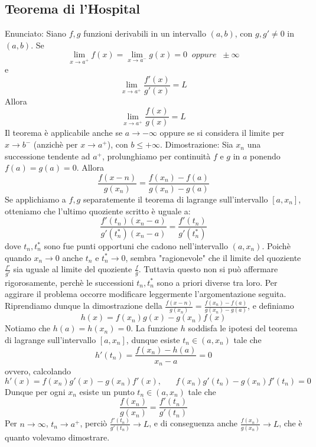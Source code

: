 \documentclass[a4paper, 9pt]{report}
\begin{document}
\subsection*{Teorema di l'Hospital}
Enunciato:\newline
Siano $f, g$ funzioni derivabili in un intervallo $(a,b)$, con $g,g' \neq 0$ in $(a,b)$. Se
\[
    \lim_{x\rightarrow a^+}f(x) = \lim_{x\rightarrow a^-}g(x) = 0 \;\;oppure \;\;\pm \infty
\]
e
\[
    \lim_{x\rightarrow a^+} \frac{f'(x)}{g'(x)}= L
\]
Allora 
\[
    \lim_{x\rightarrow a^+} \frac{f(x)}{g(x)} = L
\]
Il teorema è applicabile anche se $a \rightarrow -\infty$ oppure se si considera il limite per $x \rightarrow b^-$ (anzichè per $x \rightarrow  a^+$), con $b\leq + \infty$.
Dimostrazione:\newline
Sia $x_n$ una successione tendente ad $a^+$, prolunghiamo per continuità $f$ e $g$ in $a$ ponendo $f(a) = g(a) = 0$. Allora
\[
    \frac{f(x-n)}{g(x_n)} = \frac{f(x_n) -f(a)}{g(x_n)-g(a)}
\]
Se applichiamo a $f,g$ separatemente il teorema di lagrange sull'intervallo $[a, x_n]$, otteniamo che l'ultimo quoziente scritto è uguale a:
\[
    \frac{f'(t_n)(x_n -a)}{g'(t_n^*)(x_n-a)} = \frac{f'(t_n)}{g'(t_n^*)}
\]
dove $t_n, t_n^*$ sono fue punti opportuni che cadono nell'intervallo $(a,x_n)$. Poichè quando $x_n \rightarrow 0$ anche $t_n$ e $t_n^*\rightarrow 0$, sembra "ragionevole" che il limite del quoziente $\frac{f'}{g'}$ sia uguale al limite del quoziente $\frac{f}{g}$. Tuttavia questo non si può affermare rigorosamente, perchè le successioni $t_n, t_n^*$ sono a priori diverse tra loro. Per aggirare il problema occorre modificare leggermente l'argomentazione seguita. Riprendiamo dunque la dimostrazione della $\frac{f(x-n)}{g(x_n)} = \frac{f(x_n) -f(a)}{g(x_n)-g(a)}$, e definiamo
\[
    h(x) = f(x_n) g(x) - g(x_n) f(x)
\]
Notiamo che $h(a) = h(x_n) = 0$. La funzione $h$ soddisfa le ipotesi del teorema di lagrange sull'intervallo $[a,x_n]$, dunque esiste $t_n \in(a,x_n)$ tale che 
\[
    h'(t_n) = \frac{f(x_n) - h(a)}{x_n-a} = 0
\]
ovvero, calcolando
\[
    h'(x) = f(x_n)g'(x) -g(x_n) f'(x), \;\;\;\;\;\; f(x_n)g'(t_n)-g(x_n)f'(t_n) = 0
\]
Dunque per ogni $x_n$ esiste un punto $t_n \in (a,x_n)$ tale che 
\[
    \frac{f(x_n)}{g(x_n)} = \frac{f'(t_n)}{g'(t_n)}
\]
Per $n \rightarrow  \infty$, $t_n \rightarrow a^+$, perciò $\frac{f'(t_n)}{g'(t_n)} \rightarrow L$, e di conseguenza anche $\frac{f(x_n)}{g(x_n)} \rightarrow L$, che è quanto volevamo dimostrare.
\newpage
\end{document}
